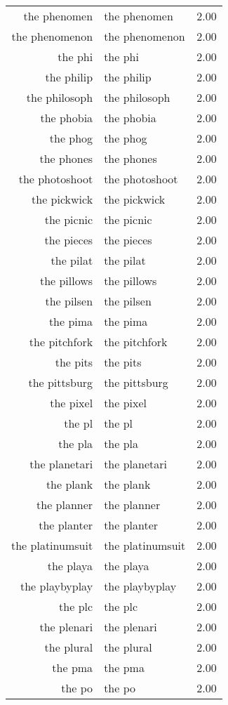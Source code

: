 \begin{table}[ht]
\begin{tabular}{rlr}
  the phenomen & the phenomen & 2.00 \\ 
  the phenomenon & the phenomenon & 2.00 \\ 
  the phi & the phi & 2.00 \\ 
  the philip & the philip & 2.00 \\ 
  the philosoph & the philosoph & 2.00 \\ 
  the phobia & the phobia & 2.00 \\ 
  the phog & the phog & 2.00 \\ 
  the phones & the phones & 2.00 \\ 
  the photoshoot & the photoshoot & 2.00 \\ 
  the pickwick & the pickwick & 2.00 \\ 
  the picnic & the picnic & 2.00 \\ 
  the pieces & the pieces & 2.00 \\ 
  the pilat & the pilat & 2.00 \\ 
  the pillows & the pillows & 2.00 \\ 
  the pilsen & the pilsen & 2.00 \\ 
  the pima & the pima & 2.00 \\ 
  the pitchfork & the pitchfork & 2.00 \\ 
  the pits & the pits & 2.00 \\ 
  the pittsburg & the pittsburg & 2.00 \\ 
  the pixel & the pixel & 2.00 \\ 
  the pl & the pl & 2.00 \\ 
  the pla & the pla & 2.00 \\ 
  the planetari & the planetari & 2.00 \\ 
  the plank & the plank & 2.00 \\ 
  the planner & the planner & 2.00 \\ 
  the planter & the planter & 2.00 \\ 
  the platinumsuit & the platinumsuit & 2.00 \\ 
  the playa & the playa & 2.00 \\ 
  the playbyplay & the playbyplay & 2.00 \\ 
  the plc & the plc & 2.00 \\ 
  the plenari & the plenari & 2.00 \\ 
  the plural & the plural & 2.00 \\ 
  the pma & the pma & 2.00 \\ 
  the po & the po & 2.00 \\ 

\end{tabular}
\end{table}
